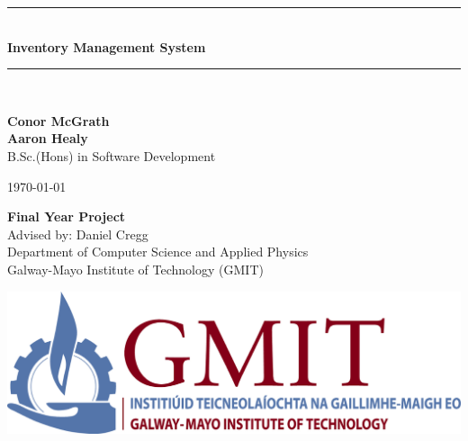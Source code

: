 \documentclass[12pt,a4paper,oneside,openany]{book}
\newcommand{\projecttitle}{Inventory Management System}
\newcommand{\projectauthor}{Conor McGrath  \\[0.2cm] Aaron Healy}
\newcommand{\projectadvisor}{Daniel Cregg}
\newcommand{\projectprogramme}{B.Sc.(Hons) in Software Development}
\newcommand{\projectdate}{\today}
\begin{document}
  \begin{titlepage}
    \begin{minipage}[t][6cm]{\textwidth}
      \centering
      \rule{\linewidth}{0.5mm} \\[0.4cm]
      { \LARGE \bfseries \projecttitle \\[0.4cm] }
      \rule{\linewidth}{0.5mm} \\[0.8cm]
    \end{minipage}
    
    \begin{minipage}[t][6.5cm]{\textwidth}
      \centering
      \textbf{\projectauthor}\\[0.5cm]
      \projectprogramme
    \end{minipage}
  
    \begin{minipage}[t][1cm]{\textwidth}
      \centering
      \textsc{\projectdate}
    \end{minipage}
      
    \begin{minipage}[t][3cm]{\textwidth}
      \centering
      \textbf{Final Year Project}\\[0.3cm]
      Advised by: \projectadvisor \\[0.1cm]
      Department of Computer Science and Applied Physics\\
      Galway-Mayo Institute of Technology (GMIT)
    \end{minipage}
  
    \begin{center}    
      \includegraphics{img/gmit-logo.jpg}
    \end{center}
  \end{titlepage}
  \setcounter{page}{2}
  \tableofcontents
  
  
  
\end{document}
